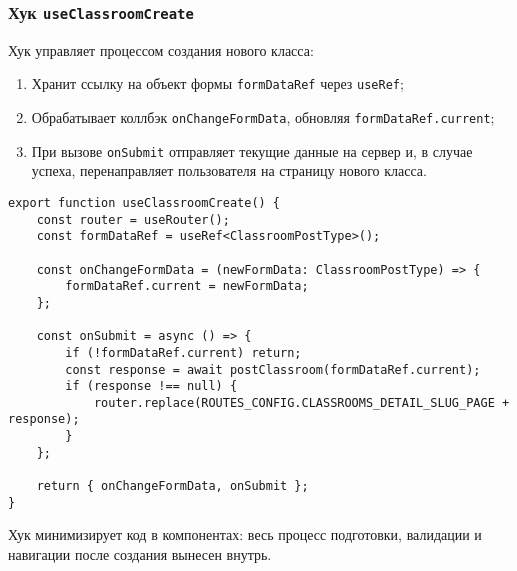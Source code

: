 \subsubsection{Хук \texttt{useClassroomCreate}}
Хук управляет процессом создания нового класса:
\begin{enumerate}
  \item Хранит ссылку на объект формы \texttt{formDataRef} через \texttt{useRef};
  \item Обрабатывает коллбэк \texttt{onChangeFormData}, обновляя \texttt{formDataRef.current};
  \item При вызове \texttt{onSubmit} отправляет текущие данные на сервер и, в случае успеха, перенаправляет пользователя на страницу нового класса.
\end{enumerate}
\begin{lstlisting}[caption={Кастомный хук useClassroomCreate}, label={lst:useClassroomCreate}]
export function useClassroomCreate() {
    const router = useRouter();
    const formDataRef = useRef<ClassroomPostType>();

    const onChangeFormData = (newFormData: ClassroomPostType) => {
        formDataRef.current = newFormData;
    };

    const onSubmit = async () => {
        if (!formDataRef.current) return;
        const response = await postClassroom(formDataRef.current);
        if (response !== null) {
            router.replace(ROUTES_CONFIG.CLASSROOMS_DETAIL_SLUG_PAGE + response);
        }
    };

    return { onChangeFormData, onSubmit };
}
\end{lstlisting}

Хук минимизирует код в компонентах: весь процесс подготовки, валидации и навигации после создания вынесен внутрь.

